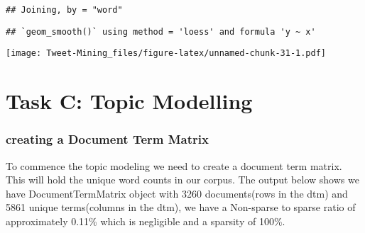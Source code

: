 \documentclass[
]{article}
\newenvironment{Shaded}{\begin{snugshade}}{\end{snugshade}}
\newcommand{\CommentTok}[1]{\textcolor[rgb]{0.56,0.35,0.01}{\textit{#1}}}
\newcommand{\DataTypeTok}[1]{\textcolor[rgb]{0.13,0.29,0.53}{#1}}
\newcommand{\DecValTok}[1]{\textcolor[rgb]{0.00,0.00,0.81}{#1}}
\newcommand{\KeywordTok}[1]{\textcolor[rgb]{0.13,0.29,0.53}{\textbf{#1}}}
\newcommand{\NormalTok}[1]{#1}
\newcommand{\OperatorTok}[1]{\textcolor[rgb]{0.81,0.36,0.00}{\textbf{#1}}}
\newcommand{\StringTok}[1]{\textcolor[rgb]{0.31,0.60,0.02}{#1}}
\begin{document}
\begin{verbatim}
## Joining, by = "word"
\end{verbatim}

\begin{Shaded}
\end{Shaded}

\begin{verbatim}
## `geom_smooth()` using method = 'loess' and formula 'y ~ x'
\end{verbatim}

\texttt{[image: Tweet-Mining\_files/figure-latex/unnamed-chunk-31-1.pdf]}

\hypertarget{task-c-topic-modelling}{%
\section{Task C: Topic Modelling}\label{task-c-topic-modelling}}

\hypertarget{creating-a-document-term-matrix}{%
\subsubsection{creating a Document Term
Matrix}\label{creating-a-document-term-matrix}}

To commence the topic modeling we need to create a document term matrix.
This will hold the unique word counts in our corpus. The output below
shows we have DocumentTermMatrix object with 3260 documents(rows in the
dtm) and 5861 unique terms(columns in the dtm), we have a Non-sparse to
sparse ratio of approximately 0.11\% which is negligible and a sparsity
of 100\%.
\end{document}
